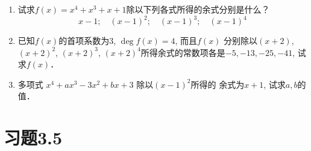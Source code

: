 \begin{ex}
\begin{enumerate}
    \item 试求$f(x)=x^4+x^3+x+1$除以下列各式所得的余式分别是什么？
\[x-1;\quad  (x-1)^2;\quad (x-1)^3;\quad (x-1)^4\]
\item 已知$f(x)$的首项系数为3, $\deg f(x)=4$, 而且$f(x)$
分别除以$(x+2)$, $(x+2)^2$, $(x+2)^3$, $(x+2)^4$所得余式的常数项各是$-5,-13,-25,-41$, 试求$f(x)$．
\item 多项式 $x^4+ax^3-3x^2+bx+3$ 除以$(x-1)^2$所得的
余式为$x+1$, 试求$a,b$的值．
\end{enumerate}
\end{ex}


\section*{习题3.5}
